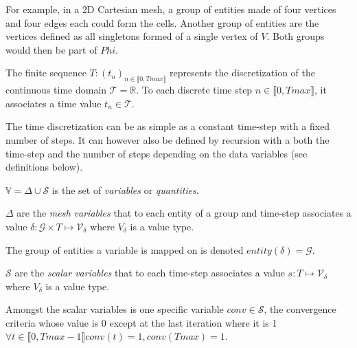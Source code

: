 For example, in a 2D Cartesian mesh, a group of entities made of four vertices and four edges each could form the cells.
Another group of entities are the vertices defined as all singletons formed of a single vertex of $V$.
Both groups would then be part of $Phi$.

\medskip

\begin{mydef}
The finite sequence $T: (t_n)_{n\in\llbracket 0, Tmax \rrbracket}$ represents the discretization of the continuous time domain $\mathcal{T}=\mathbb{R}$.
To each discrete time step $n\in\llbracket 0, Tmax \rrbracket$, it associates a time value $t_n\in\mathcal{T}$.
\end{mydef}

The time discretization can be as simple as a constant time-step with a fixed number of steps.
It can however also be defined by recursion with a both the time-step and the number of steps depending on the data variables (see definitions below).

\medskip

\begin{mydefs}
\item $\mathbb{V}=\Delta\cup\mathcal{S}$ is the set of \emph{variables} or \emph{quantities}.
\item $\Delta$ are the \textit{mesh variables} that to each entity of a group and time-step associates a value $\delta: \mathcal{G}\times T\mapsto \mathcal{V}_\delta$ where $V_{\delta}$ is a value type.
\item The group of entities a variable is mapped on is denoted $entity(\delta)=\mathcal{G}$.
\item $\mathcal{S}$ are the \textit{scalar variables} that to each time-step associates a value $s: T\mapsto \mathcal{V}_\delta$ where $V_{\delta}$ is a value type.
\item Amongst the scalar variables is one specific variable $conv\in\mathcal{S}$, the convergence criteria whose value is $0$ except at the last iteration where it is 1 $\forall t\in \llbracket 0, Tmax-1 \rrbracket conv(t)=1, conv(Tmax)=1$.
\end{mydefs}


\medskip

